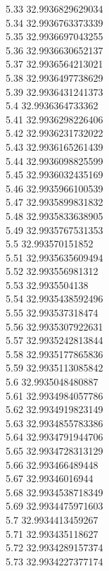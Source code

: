 {5.33	32.9936829629034\\
5.34	32.9936763373339\\
5.35	32.9936697043255\\
5.36	32.9936630652137\\
5.37	32.9936564213021\\
5.38	32.9936497738629\\
5.39	32.9936431241373\\
5.4	32.9936364733362\\
5.41	32.9936298226406\\
5.42	32.9936231732022\\
5.43	32.9936165261439\\
5.44	32.9936098825599\\
5.45	32.9936032435169\\
5.46	32.9935966100539\\
5.47	32.9935899831832\\
5.48	32.9935833638905\\
5.49	32.9935767531353\\
5.5	32.993570151852\\
5.51	32.9935635609494\\
5.52	32.993556981312\\
5.53	32.9935504138\\
5.54	32.9935438592496\\
5.55	32.993537318474\\
5.56	32.9935307922631\\
5.57	32.9935242813844\\
5.58	32.9935177865836\\
5.59	32.9935113085842\\
5.6	32.9935048480887\\
5.61	32.9934984057786\\
5.62	32.9934919823149\\
5.63	32.9934855783386\\
5.64	32.9934791944706\\
5.65	32.9934728313129\\
5.66	32.993466489448\\
5.67	32.99346016944\\
5.68	32.9934538718349\\
5.69	32.9934475971603\\
5.7	32.9934413459267\\
5.71	32.993435118627\\
5.72	32.9934289157374\\
5.73	32.9934227377174\\
}
